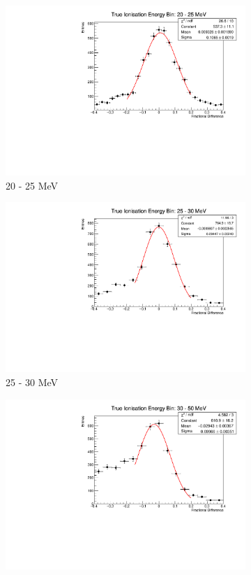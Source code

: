 \begin{figure}
\begin{subfigure}[b]{0.49\textwidth}
		\includegraphics[width=\textwidth]{figures/ion_res_20.pdf}
		\caption {20 - 25 MeV}
	\end{subfigure}
	\hfill
	\begin{subfigure}[b]{0.49\textwidth}
		\centering
		\vspace{5mm}
		\includegraphics[width=\textwidth]{figures/ion_res_25.pdf}
		\caption {25 - 30 MeV}
	\end{subfigure}
	\begin{subfigure}[b]{0.49\textwidth}
		\centering
		\vspace{5mm}
		\includegraphics[width=\textwidth]{figures/ion_res_30.pdf}

\end{subfigure}
\end{figure}
